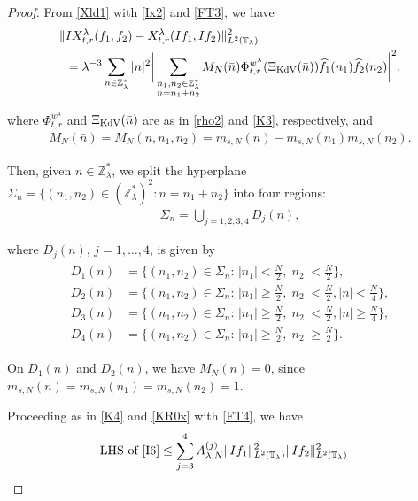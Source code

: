 \documentclass[letterpaper, 11pt,  reqno]{amsart}
\newcommand{\1}{\hspace{0.5mm}\text{I}\hspace{0.5mm}}
\newcommand{\noi}{\noindent}
\newcommand{\Z}{\mathbb{Z}}
\newcommand{\T}{\mathbb{T}}
\newcommand{\ld}{\lambda}
\newcommand{\Si}{\Sigma}
\newcommand{\ft}{\widehat}
\newcommand{\KDV}{\text{\rm KdV} }
\numberwithin{equation}{section}
\numberwithin{theorem}{section}
\begin{document}
\begin{proof}

From \eqref{Xld1} with \eqref{Ix2} and \eqref{FT3}, we have 
\begin{align}
\begin{aligned}
\|  & I X^{\ld}_{t,r}( f _1, f _2) - X^{\ld}_{t,r} (I  f_1, I  f_2) \|^2_{L^2(\T_\ld)}\\
&=
\ld^{-3} \sum_{ n\in\Z_{\ld}^*}
|n|^2 \bigg| \sum_{\substack{n_1, n_2 \in\Z_{\ld}^*\\n = n_1+n_2}}
M_N(\bar n)
\Phi^{w^\ld}_{t,r}(\Xi_\KDV(\bar n))
\ft  f _1(n_1) \ft  f _2 (n_2)
\bigg|^2 ,
\end{aligned}
\label{I6}
\end{align}

\noi
where $\Phi^{w^\ld}_{t, r}$ and 
$\Xi_\KDV(\bar n)$
are as in \eqref{rho2} 
 and \eqref{K3}, respectively, 
 and 
\begin{align}
M_N(\bar n)=  M_N(n,n_1, n_2)=  m_{s, N} (n) - m_{s, N} (n_1) m_{s, N}(n_2) .
\label{I6a}
\end{align}


\noi
Then, given $n \in \Z_\ld^*$, 
we split  the hyperplane $\Si_n = \big\{ (n_1, n_2)\in (\Z_\ld^*)^2:
n = n_1+n_2\big\}$ into four regions: 
\begin{align*}
\Si_n 
= \bigcup_{j=1,2,3,4} D_j(n), 
\end{align*}



\noi
where $D_j(n)$,  $j=1,\dots,4$,  is given by 
\begin{align}
\begin{aligned}
D_1(n)&=\Big\{ (n_1, n_2)\in \Si_n :\, |n_1| <  \frac N2, |n_2| <  \frac N2 \Big\}, \\
D_2(n)&=\Big\{(n_1, n_2)\in \Si_n:\, |n_1| \geq \frac N2, |n_2| <  \frac N2, |n|<  \frac N4 \Big\}, \\
D_3(n)&=\Big\{(n_1, n_2)\in \Si_n:\, |n_1| \geq \frac N2, |n_2| <  \frac N2, |n|\geq \frac N4 \Big\}, \\
D_4(n)&=\Big\{(n_1, n_2)\in \Si_n:\, |n_1| \geq \frac N2, |n_2| \geq \frac N2 \Big\}. 
\label{I8}
\end{aligned}
\end{align}


\noi
On $D_1(n)$ and $D_2(n)$, we have $M_N(\bar n) = 0$, 
since
$m_{s, N}(n)=m_{s, N}(n_1)=m_{s, N}(n_2)=1$. 

Proceeding as in \eqref{K4} and \eqref{KR0x}
with \eqref{FT4}, 
we have 
\begin{align*}
\text{LHS of \eqref{I6}}
&\leq \sum_{j = 3}^4 
A_{\ld, N}^{(j)} \| I  f_1 \|_{L^2(\T_\ld)}^2 \| I  f_2 \|_{L^2(\T_\ld)}^2
\end{align*}


\end{proof}
\end{document}
